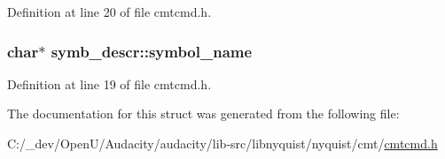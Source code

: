 Definition at line 20 of file cmtcmd.\+h.

\subsubsection[{\texorpdfstring{symbol\+\_\+name}{symbol_name}}]{\setlength{\rightskip}{0pt plus 5cm}char$\ast$ symb\+\_\+descr\+::symbol\+\_\+name}\hypertarget{structsymb__descr_a10ff43137b67790330f9d2526d38744f}{}\label{structsymb__descr_a10ff43137b67790330f9d2526d38744f}


Definition at line 19 of file cmtcmd.\+h.



The documentation for this struct was generated from the following file\+:\begin{DoxyCompactItemize}
\item 
C\+:/\+\_\+dev/\+Open\+U/\+Audacity/audacity/lib-\/src/libnyquist/nyquist/cmt/\hyperlink{cmtcmd_8h}{cmtcmd.\+h}\end{DoxyCompactItemize}
